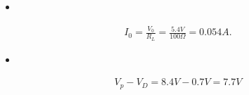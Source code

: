 \begin{itemize}
\item {\bfseries\itshape{}} \hfill \break
{\bfseries\itshape{}}
\end{itemize}

\begin{ceqn}
\begin{align}
I_{0} = \frac{V_{0}}{R_{L}} = \frac{5.4V}{100\Omega} = 0.054 A.
\end{align}
\end{ceqn}

\begin{itemize}
\item {\bfseries\itshape{}} \hfill \break
\end{itemize}

\begin{ceqn}
\begin{align}
V_{p} - V_{D} = 8.4 V - 0.7V = 7.7 V
\end{align}
\end{ceqn}

\pagebreak